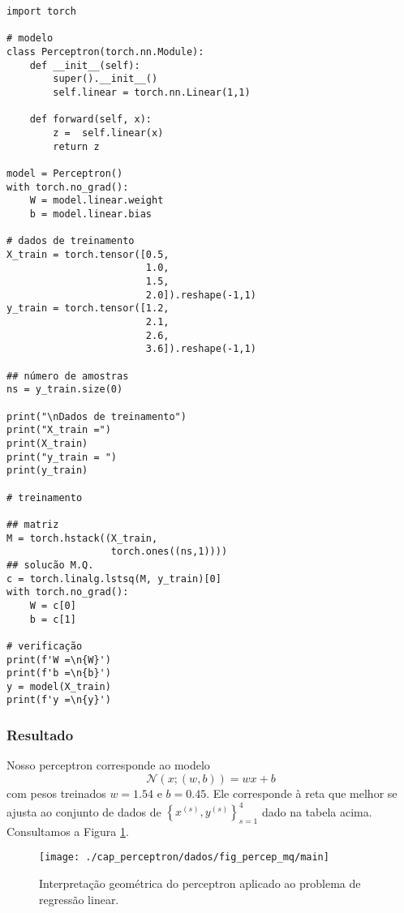 \begin{lstlisting}[caption=perceptron\_mq.py, label=cap_perceptron_sec_unit:cod:perceptron_mq]
import torch

# modelo
class Perceptron(torch.nn.Module):
    def __init__(self):
        super().__init__()
        self.linear = torch.nn.Linear(1,1)

    def forward(self, x):
        z =  self.linear(x)
        return z

model = Perceptron()
with torch.no_grad():
    W = model.linear.weight
    b = model.linear.bias

# dados de treinamento
X_train = torch.tensor([0.5,
                        1.0,
                        1.5,
                        2.0]).reshape(-1,1)
y_train = torch.tensor([1.2,
                        2.1,
                        2.6,
                        3.6]).reshape(-1,1)

## número de amostras
ns = y_train.size(0)

print("\nDados de treinamento")
print("X_train =")
print(X_train)
print("y_train = ")
print(y_train)

# treinamento

## matriz
M = torch.hstack((X_train,
                  torch.ones((ns,1))))
## solucão M.Q.
c = torch.linalg.lstsq(M, y_train)[0]
with torch.no_grad():
    W = c[0]
    b = c[1]

# verificação
print(f'W =\n{W}')
print(f'b =\n{b}')
y = model(X_train)
print(f'y =\n{y}')
\end{lstlisting}

\subsubsection{Resultado}

Nosso perceptron corresponde ao modelo
\begin{equation}
  \mathcal{N}(x; (w, b)) = wx + b
\end{equation}
com pesos treinados $w = 1.54$ e $b = 0.45$. Ele corresponde à reta que melhor se ajusta ao conjunto de dados de $\left\{x^{(s)}, y^{(s)}\right\}_{s=1}^4$ dado na tabela acima. Consultamos a Figura \ref{fig:percep_mq}.

\begin{figure}[H]
  \centering
  \texttt{[image: ./cap\_perceptron/dados/fig\_percep\_mq/main]}
  \caption{Interpretação geométrica do perceptron aplicado ao problema de regressão linear.}
  \label{fig:percep_mq}
\end{figure}

